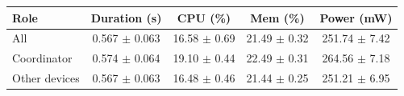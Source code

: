 \begin{tabular}{lcccc}
\hline
\textbf{Role} & \textbf{Duration (s)} & \textbf{CPU (\%)} & \textbf{Mem (\%)} & \textbf{Power (mW)} \\
\hline
All & 0.567 $\pm$ 0.063 & 16.58 $\pm$ 0.69 & 21.49 $\pm$ 0.32 & 251.74 $\pm$ 7.42 \\
Coordinator & 0.574 $\pm$ 0.064 & 19.10 $\pm$ 0.44 & 22.49 $\pm$ 0.31 & 264.56 $\pm$ 7.18 \\
Other devices & 0.567 $\pm$ 0.063 & 16.48 $\pm$ 0.46 & 21.44 $\pm$ 0.25 & 251.21 $\pm$ 6.95 \\
\hline
\end{tabular}
